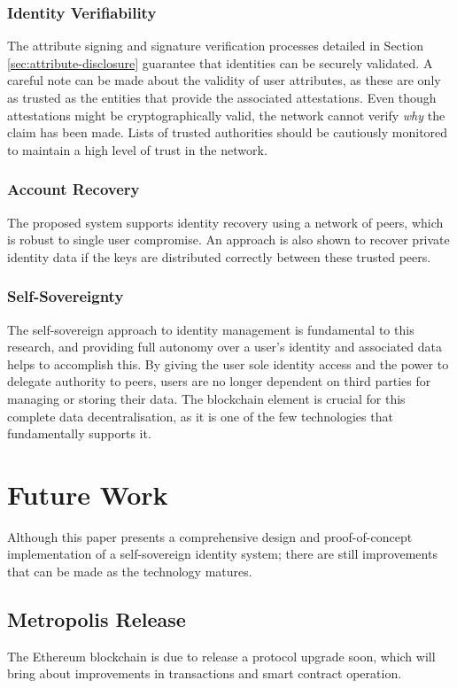 \subsubsection{Identity Verifiability}
The attribute signing and signature verification processes detailed in Section \ref{sec:attribute-disclosure} guarantee that identities can be securely validated. A careful note can be made about the validity of user attributes, as these are only as trusted as the entities that provide the associated attestations. Even though attestations might be cryptographically valid, the network cannot verify \textit{why} the claim has been made. Lists of trusted authorities should be cautiously monitored to maintain a high level of trust in the network.

\subsubsection{Account Recovery}
The proposed system supports identity recovery using a network of peers, which is robust to single user compromise. An approach is also shown to recover private identity data if the keys are distributed correctly between these trusted peers.

\subsubsection{Self-Sovereignty}
The self-sovereign approach to identity management is fundamental to this research, and providing full autonomy over a user's identity and associated data helps to accomplish this. By giving the user sole identity access and the power to delegate authority to peers, users are no longer dependent on third parties for managing or storing their data. The blockchain element is crucial for this complete data decentralisation, as it is one of the few technologies that fundamentally supports it.

\section{Future Work}
Although this paper presents a comprehensive design and proof-of-concept implementation of a self-sovereign identity system; there are still improvements that can be made as the technology matures. 

\subsection{Metropolis Release}
The Ethereum blockchain is due to release a protocol upgrade soon, which will bring about improvements in transactions and smart contract operation.

